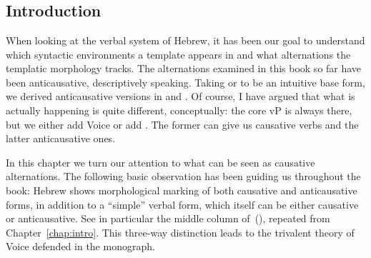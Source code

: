 \chapter{\vd}
\label{chap:vd}

\section{Introduction}
When looking at the verbal system of Hebrew, it has been our goal to understand which syntactic environments a template appears in and what alternations the templatic morphology tracks. The alternations examined in this book so far have been anticausative, descriptively speaking. Taking {\tkal} or {\tpie} to be an intuitive base form, we derived anticausative versions in {\tnif} and {\thit}. Of course, I have argued that what is actually happening is quite different, conceptually: the core vP is always there, but we either add Voice or add {\vz}. The former can give us causative verbs and the latter anticausative ones.

In this chapter we turn our attention to what can be seen as causative alternations. The following basic observation has been guiding us throughout the book: Hebrew shows morphological marking of both causative and anticausative forms, in addition to a ``simple'' verbal form, which itself can be either causative or anticausative. See in particular the middle column of~(\nextx), repeated from Chapter~\ref{chap:intro}. This three-way distinction leads to the trivalent theory of Voice defended in the monograph.
\ex \label{vd:ex:alternations-heb}
\xe

